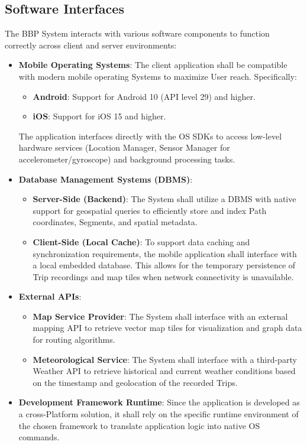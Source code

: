 \subsection{Software Interfaces}
The BBP System interacts with various software components to function correctly across client and server environments:

\begin{itemize}
    \item \textbf{Mobile Operating Systems}: 
    The client application shall be compatible with modern mobile operating Systems to maximize User reach. Specifically:
    \begin{itemize}
        \item \textbf{Android}: Support for Android 10 (API level 29) and higher.
        \item \textbf{iOS}: Support for iOS 15 and higher.
    \end{itemize}
    The application interfaces directly with the OS SDKs to access low-level hardware services (Location Manager, Sensor Manager for accelerometer/gyroscope) and background processing tasks.

    \item \textbf{Database Management Systems (DBMS)}:
    \begin{itemize}
        \item \textbf{Server-Side (Backend)}: The System shall utilize a DBMS with native support for geospatial queries to efficiently store and index Path coordinates, Segments, and spatial metadata.
        \item \textbf{Client-Side (Local Cache)}: To support data caching and synchronization requirements, the mobile application shall interface with a local embedded database. This allows for the temporary persistence of Trip recordings and map tiles when network connectivity is unavailable.
    \end{itemize}

    \item \textbf{External APIs}:
    \begin{itemize}
        \item \textbf{Map Service Provider}: The System shall interface with an external mapping API to retrieve vector map tiles for visualization and graph data for routing algorithms.
        \item \textbf{Meteorological Service}: The System shall interface with a third-party Weather API to retrieve historical and current weather conditions based on the timestamp and geolocation of the recorded Trips.
    \end{itemize}

    \item \textbf{Development Framework Runtime}: 
    Since the application is developed as a cross-Platform solution, it shall rely on the specific runtime environment of the chosen framework to translate application logic into native OS commands.
\end{itemize}

